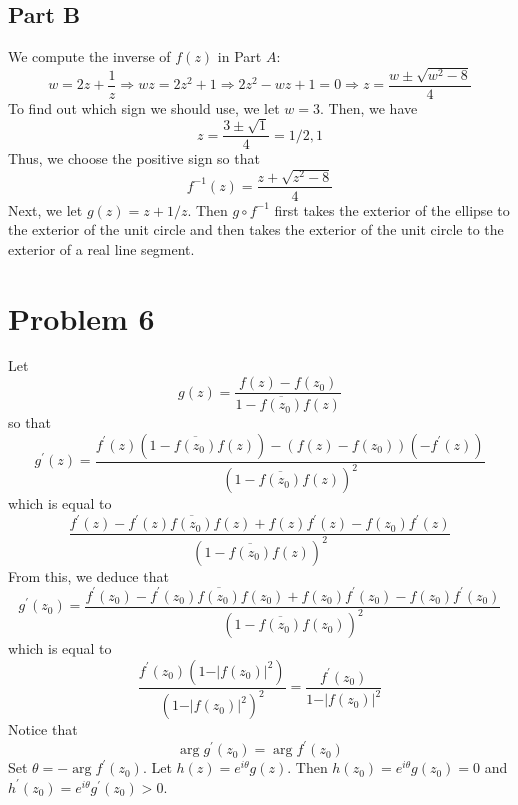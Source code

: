\documentclass[12pt]{article}
\begin{document}
\subsection*{Part B}
We compute the inverse of $f(z)$ in Part $A$:
\[
w = 2z + \frac{1}{z} \Rightarrow wz = 2z^2 + 1 \Rightarrow 2z^2 - wz + 1 = 0 \Rightarrow z = \frac{w \pm \sqrt{w^2 - 8}}{4}
\] To find out which sign we should use, we let $w = 3$. Then, we have
\[
z = \frac{3\pm\sqrt{1}}{4} = 1/2,1
\] Thus, we choose the positive sign so that
\[
f^{-1}(z) = \frac{z + \sqrt{z^2 - 8}}{4}
\] Next, we let $g(z) = z + 1/z$. Then $g \circ f^{-1}$ first takes the exterior of the ellipse to the exterior of the unit circle and then takes the exterior of the unit circle to the exterior of a real line segment.
\newpage
\section*{Problem 6}
Let 
\[
g(z) = \frac{f(z) - f(z_0)}{1- \overline{f(z_0)}f(z)}
\] so that
\[
g^\prime(z) = \frac{f^\prime(z)(1-\overline{f(z_0)}f(z)) - (f(z)-f(z_0))(-f^\prime(z))}{(1-\overline{f(z_0)}f(z))^2}
\] which is equal to
\[
\frac{f^\prime(z) - f^\prime(z)\overline{f(z_0)}f(z) + f(z)f^\prime(z) - f(z_0)f^\prime(z)}{(1-\overline{f(z_0)}f(z))^2}
\] From this, we deduce that
\[
g^\prime(z_0) = \frac{f^\prime(z_0) - f^\prime(z_0)\overline{f(z_0)}f(z_0) + f(z_0)f^\prime(z_0) - f(z_0)f^\prime(z_0)}{(1-\overline{f(z_0)}f(z_0))^2}
\] which is equal to
\[
\frac{f^\prime(z_0)(1- \vert f(z_0) \vert^2)}{( 1-  \vert f(z_0)\vert^2)^2} = \frac{f^\prime(z_0)}{1 - \vert f(z_0) \vert^2}
\] Notice that 
\[
\arg g^\prime(z_0) = \arg f^\prime(z_0)
\] Set $\theta = -\arg f^\prime(z_0)$. Let $h(z) = e^{i\theta} g(z)$. Then $h(z_0) = e^{i\theta} g(z_0) = 0$ and $h^\prime(z_0) = e^{i\theta} g^\prime(z_0) > 0$.
\newpage
\end{document}
